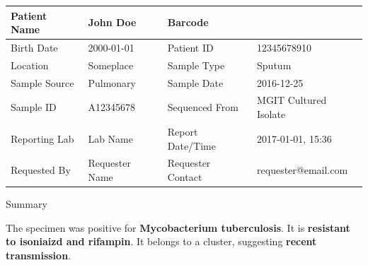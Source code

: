 \documentclass[12pt]{article}
\begin{document}


\tabulinesep=5pt
\noindent 
{}
\noindent \begin{tabu} to \textwidth {|XU||XU|}
\hline
Patient Name  & John Doe       & Barcode        &          \\ \hline
Birth Date    & 2000-01-01     & Patient ID          & 12345678910           \\ \hline
Location   & Someplace         & Sample Type       & Sputum          \\ \hline
Sample Source & Pulmonary	   & Sample Date & 2016-12-25      \\ \hline
Sample ID & A12345678	   & Sequenced From & MGIT Cultured Isolate       \\ \hline
Reporting Lab & Lab Name       & Report Date/Time  & 2017-01-01, 15:36   \\ \hline
Requested By  & Requester Name & Requester Contact & requester@email.com \\ \hline
\end{tabu}
\vspace{5mm}




\begin{reportSection}{Summary}
\vspace{1mm}

The specimen was positive for \textbf{Mycobacterium tuberculosis}. It is \textbf{resistant to isoniaizd and rifampin}. It belongs to a cluster, suggesting \textbf{recent transmission}.
\end{reportSection}
\vspace{5mm}
\end{document}
